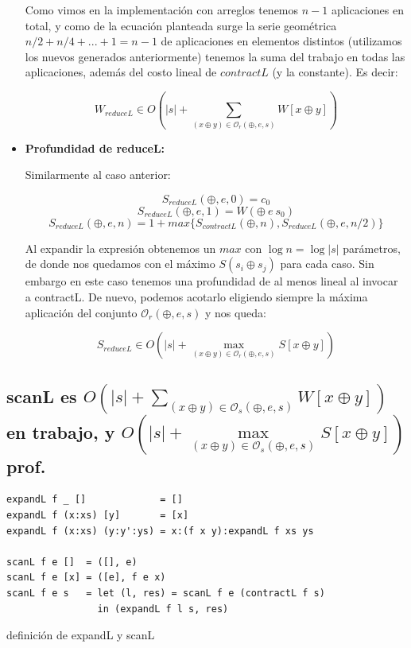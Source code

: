 \documentclass[12pt]{article}
\begin{document}
\begin{itemize}
    Como vimos en la implementación con arreglos tenemos $n-1$ aplicaciones en total, y como de la ecuación planteada surge la serie geométrica $n/2 + n/4 + ... + 1 = n-1$ de aplicaciones en elementos distintos (utilizamos los nuevos generados anteriormente) tenemos la suma del trabajo en todas las aplicaciones, además del costo lineal de $contractL$ (y la constante). Es decir:
    
    $$ W_{reduceL} \in O(|s| + \sum\limits_{(x\oplus y)\in\mathcal{O}_r(\oplus,e,s)} W[x\oplus y]) $$

\item \textbf{Profundidad de reduceL:}

    Similarmente al caso anterior:
    
    $$ S_{reduceL}(\oplus, e, 0) = c_0 $$
    $$ S_{reduceL}(\oplus, e, 1) = W(\oplus\ e\ s_0) $$
    $$ S_{reduceL}(\oplus, e, n) = 1 + max\{ S_{contractL}(\oplus, n), S_{reduceL}(\oplus, e, n/2) \} $$
    
    Al expandir la expresión obtenemos un $max$ con $\log n = \log |s|$ parámetros, de donde nos quedamos con el máximo $S(s_i \oplus s_j)$ para cada caso. Sin embargo en este caso tenemos una profundidad de al menos lineal al invocar a contractL. De nuevo, podemos acotarlo eligiendo siempre la máxima aplicación del conjunto $\mathcal{O}_r(\oplus,e,s)$ y nos queda:

    $$ S_{reduceL} \in O(|s| + \max\limits_{(x\oplus y)\in\mathcal{O}_r(\oplus,e,s)} S[x\oplus y]) $$
    
\end{itemize}


\subsection{scanL es $O(|s| + \sum\limits_{(x\oplus y)\in\mathcal{O}_s(\oplus,e,s)} W[x\oplus y])$ en trabajo, y $O(|s| + \max\limits_{(x\oplus y)\in\mathcal{O}_s(\oplus,e,s)} S[x\oplus y])$ prof.}

\begin{table}[h]
\begin{lstlisting}
expandL f _ []             = []
expandL f (x:xs) [y]       = [x]
expandL f (x:xs) (y:y':ys) = x:(f x y):expandL f xs ys

scanL f e []  = ([], e)
scanL f e [x] = ([e], f e x)
scanL f e s   = let (l, res) = scanL f e (contractL f s) 
                in (expandL f l s, res)
\end{lstlisting}

\caption{definición de expandL y scanL}
\end{table}
\end{document}
